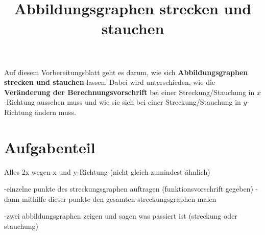 \documentclass[]{uebungsblatt}
\title{Abbildungsgraphen strecken und stauchen}
\begin{document}
\maketitle
\begin{contents}
    Auf diesem Vorbereitungsblatt geht es darum, wie sich \textbf{Abbildungsgraphen strecken und stauchen} lassen. Dabei wird unterschieden, wie die \textbf{Veränderung der Berechnungsvorschrift} bei einer Streckung/Stauchung in $x$-Richtung aussehen muss und wie sie sich bei einer Streckung/Stauchung in $y$-Richtung ändern muss.
\end{contents}

\section*{Aufgabenteil}
Alles 2x wegen x und y-Richtung (nicht gleich zumindest ähnlich)

-einzelne punkte des streckungsgraphen auftragen  (funktionsvorschrift gegeben)
-dann mithilfe dieser punkte den gesamten streckungsgraphen malen

-zwei abbildungsgraphen zeigen und sagen was passiert ist (streckung oder stauchung)

\end{document}
